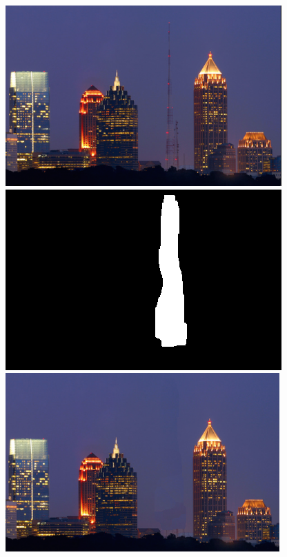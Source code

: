 \documentclass[a4paper, 10pt]{article}
\begin{document}
\begin{figure}[H]
\begin{minipage}{.4\textwidth}
\centering
\includegraphics[scale=0.25]{images/skyline.png}
\end{minipage}%
\begin{minipage}{.4\textwidth}
\centering
\includegraphics[scale=0.25]{skyline-mask.png}
\end{minipage}%
\begin{minipage}{.4\textwidth}
\centering
\includegraphics[scale=0.25]{inpainted_skyline17.png}
\end{minipage}%
\end{figure}
\end{document}

